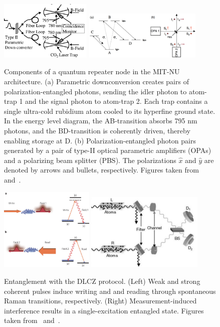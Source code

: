 \documentclass[aps,twocolumn,secnumarabic,amsmath,amssymb,pra,groupedaddress,
showpacs, showkeys,draft]{revtex4-1}
\begin{document}
\begin{figure}[t]
	\centering
	\includegraphics[width=0.39\textwidth]{figures/node}
  	\includegraphics[width=0.50\textwidth]{figures/level_structure_opa1}
	\caption{Components of a quantum repeater node in the MIT-NU architecture. (a) Parametric downconversion creates pairs of polarization-entangled photons, sending the idler photon to atom-trap 1 and the signal photon to atom-trap 2. Each trap contains a single ultra-cold rubidium atom cooled to its hyperfine ground state. In the energy level diagram, the AB-transition absorbs 795 nm photons, and the BD-transition is coherently driven, thereby enabling storage at D. (b) Polarization-entangled photon pairs generated by a pair of type-II optical parametric amplifiers (OPAs) and a polarizing beam splitter (PBS). The polarizations $\hat{x}$ and $\hat{y}$ are denoted by arrows and bullets, respectively. Figures taken from~\cite{PhysRevLett.87.167903} and~\cite{1464-4266-2-1-101}.}
	\label{fig:diagram}
\end{figure}

\begin{figure}[t]
	\centering
	\includegraphics[width=0.40\textwidth]{figures/dlcz}
  	\includegraphics[width=0.50\textwidth]{figures/dlcz_entanglement}
	\caption{Entanglement with the DLCZ protocol. (Left) Weak and strong coherent pulses induce writing and and reading through spontaneous Raman transitions, respectively. (Right) Measurement-induced interference results in a single-excitation entangled state.  Figures taken from~\cite{nature07127} and~\cite{nature35106500}.}
	\label{fig:dlcz}
\end{figure}
\end{document}
